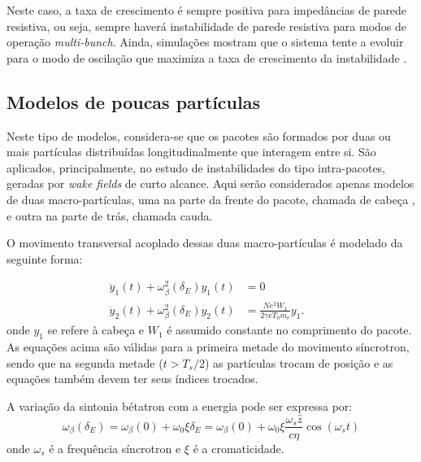 Neste caso, a taxa de crescimento é sempre positiva para impedâncias de parede resistiva, ou seja, sempre haverá instabilidade de parede resistiva para modos de operação \textit{multi-bunch}. Ainda, simulações mostram que o sistema tente a evoluir para o modo de oscilação que maximiza a taxa de crescimento da instabilidade \cite{Khan}.

\subsection{Modelos de poucas partículas}

Neste tipo de modelos, considera-se que os pacotes são formados por duas ou mais partículas distribuídas longitudinalmente que interagem entre si. São aplicados, principalmente, no estudo de instabilidades do tipo intra-pacotes, geradas por \textit{wake fields} de curto alcance. Aqui serão considerados apenas modelos de duas macro-partículas, uma na parte da frente do pacote, chamada de cabeça , e outra na parte de trás, chamada cauda.

O movimento transversal acoplado dessas duas macro-partículas é modelado da seguinte forma:

\begin{align}
 \ddot{y}_1(t)+\omega^2_\beta(\delta_E)y_1(t)&=0& \\
 \ddot{y}_2(t)+\omega^2_\beta(\delta_E)y_2(t)&=\frac{Ne^2 W_1}{2\gamma c
T_0m_e}y_1.&
\end{align}
onde $y_1$ se refere à cabeça e $W_1$ é assumido constante no comprimento do pacote. As equações acima são válidas para a primeira metade do movimento síncrotron, sendo que na segunda metade ($t>T_s/2$) as partículas trocam de posição e as equações também devem ter seus índices trocados.

A variação da sintonia bétatron com a energia pode ser expressa por:
\begin{equation}
 \omega_\beta(\delta_E)=\omega_\beta(0)+\omega_0 \xi \delta_E =
\omega_\beta(0)+\omega_0 \xi \frac{\omega_s\hat{z}}{c \eta} \cos(\omega_st)
\end{equation}
onde $\omega_s$ é a frequência síncrotron e $\xi$ é a cromaticidade.

